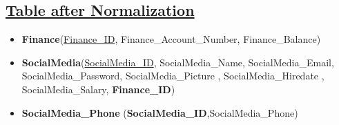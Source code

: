 \subsection*{\underline{Table after Normalization}}
\begin{itemize}
    \item \textbf{Finance}(\underline{Finance\_ID}, Finance\_Account\_Number, Finance\_Balance)
    \item \textbf{SocialMedia}(\underline{SocialMedia\_ID}, SocialMedia\_Name, SocialMedia\_Email, SocialMedia\_Password, SocialMedia\_Picture ,  SocialMedia\_Hiredate , SocialMedia\_Salary, \textbf{Finance\_ID})
    \item \textbf{SocialMedia\_Phone} (\textbf{SocialMedia\_ID},{SocialMedia\_Phone})
\end{itemize}
\clearpage